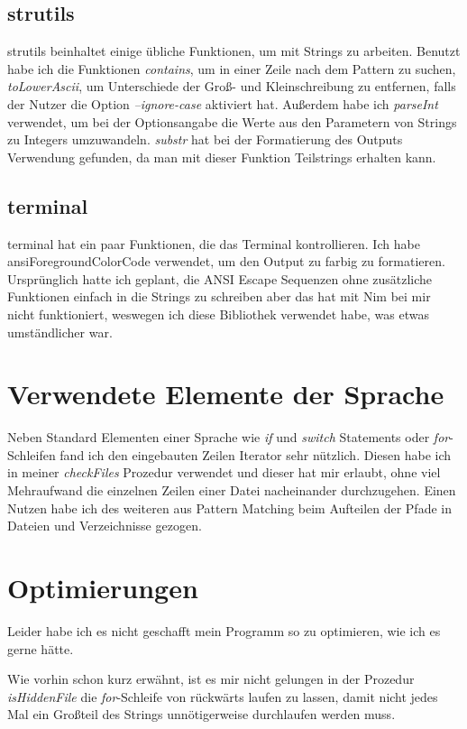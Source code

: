 \documentclass[11pt]{report}
\begin{document}
\subsection{strutils}
strutils beinhaltet einige übliche Funktionen, um mit Strings zu arbeiten.
Benutzt habe ich die Funktionen \emph{contains}, um in einer Zeile nach dem Pattern zu suchen, \emph{toLowerAscii}, um Unterschiede der Groß- und Kleinschreibung zu entfernen, falls der Nutzer die Option \emph{--ignore-case} aktiviert hat. Außerdem habe ich \emph{parseInt} verwendet, um bei der Optionsangabe die Werte aus den Parametern von Strings zu Integers umzuwandeln.
\emph{substr} hat bei der Formatierung des Outputs Verwendung gefunden, da man mit dieser Funktion Teilstrings erhalten kann.
\subsection{terminal}
terminal hat ein paar Funktionen, die das Terminal kontrollieren.
Ich habe ansiForegroundColorCode verwendet, um den Output zu farbig zu formatieren. Ursprünglich hatte ich geplant, die ANSI Escape Sequenzen ohne zusätzliche Funktionen einfach in die Strings zu schreiben aber das hat mit Nim bei mir nicht funktioniert, weswegen ich diese Bibliothek verwendet habe, was etwas umständlicher war.

\section{Verwendete Elemente der Sprache}
Neben Standard Elementen einer Sprache wie \emph{if} und \emph{switch} Statements oder \emph{for}-Schleifen fand ich den eingebauten Zeilen Iterator sehr nützlich. Diesen habe ich in meiner \emph{checkFiles} Prozedur verwendet und dieser hat mir erlaubt, ohne viel Mehraufwand die einzelnen Zeilen einer Datei nacheinander durchzugehen.
Einen Nutzen habe ich des weiteren aus Pattern Matching beim Aufteilen der Pfade in Dateien und Verzeichnisse gezogen.

\section{Optimierungen}
Leider habe ich es nicht geschafft mein Programm so zu optimieren, wie ich es gerne hätte.


Wie vorhin schon kurz erwähnt, ist es mir nicht gelungen in der Prozedur \emph{isHiddenFile} die \emph{for}-Schleife von rückwärts laufen zu lassen, damit nicht jedes Mal ein Großteil des Strings unnötigerweise durchlaufen werden muss.
\end{document}
